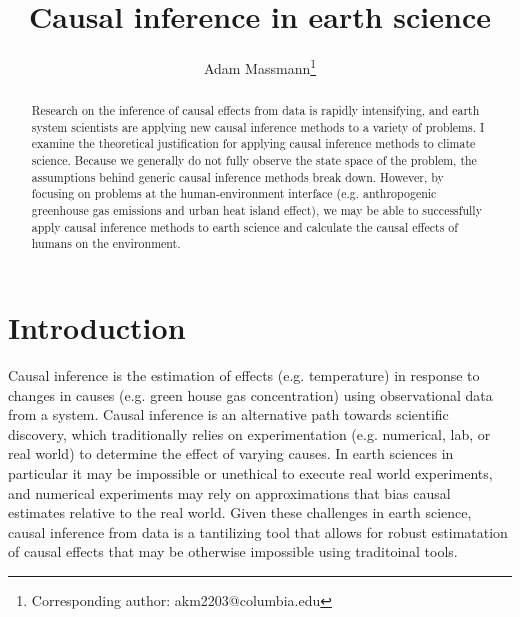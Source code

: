 \documentclass[12pt]{article}
\begin{document}
\title{Causal inference in earth science}

\author{Adam Massmann\thanks{Corresponding author: akm2203@columbia.edu}}

\maketitle

\begin{abstract}
  Research on the inference of causal effects from data is rapidly
  intensifying, and earth system scientists are applying new causal
  inference methods to a variety of problems. I examine the
  theoretical justification for applying causal inference methods to
  climate science. Because we generally do not fully observe the state
  space of the problem, the assumptions behind generic causal
  inference methods break down. However, by focusing on problems at
  the human-environment interface (e.g. anthropogenic greenhouse gas
  emissions and urban heat island effect), we may be able to
  successfully apply causal inference methods to earth science and
  calculate the causal effects of humans on the environment.

\end{abstract}

\section{Introduction}


Causal inference is the estimation of effects (e.g. temperature)
in response to changes in causes (e.g. green house gas
concentration) using observational data from a system. Causal
inference is an alternative path towards scientific discovery,
which traditionally relies on experimentation (e.g. numerical,
lab, or real world) to determine the effect of varying causes. In
earth sciences in particular it may be impossible or unethical to
execute real world experiments, and numerical experiments may rely
on approximations that bias causal estimates relative to the real
world. Given these challenges in earth science, causal inference
from data is a tantilizing tool that allows for robust
estimatation of causal effects that may be otherwise impossible
using traditoinal tools.


\end{document}

